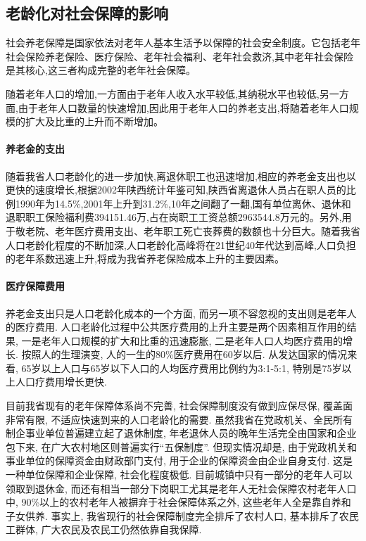 \documentclass[a4paper, 12pt, UTF8]{article}
\begin{document}
\subsection{老龄化对社会保障的影响}
社会养老保障是国家依法对老年人基本生活予以保障的社会安全制度。它包括老年社会保险养老保险、医疗保险、老年社会福利、老年社会救济,其中老年社会保险是其核心,这三者构成完整的老年社会保障。

随着老年人口的增加,一方面由于老年人收入水平较低,其纳税水平也较低,另一方面,由于老年人口数量的快速增加,因此用于老年人口的养老支出,将随着老年人口规模的扩大及比重的上升而不断增加。

\paragraph{养老金的支出} 
随着我省人口老龄化的进一步加快,离退休职工也迅速增加,相应的养老金支出也以更快的速度增长,根据2002年陕西统计年鉴可知,陕西省离退休人员占在职人员的比例1990年为14.5\%,2001年上升到31.2\%,10年之间翻了一翻,国有单位离休、退休和退职职工保险福利费394151.46万,占在岗职工工资总额2963544.8万元的。另外,用于敬老院、老年医疗费用支出、老年职工死亡丧葬费的数额也十分巨大。随着我省人口老龄化程度的不断加深,人口老龄化高峰将在21世纪40年代达到高峰,人口负担的老年系数迅速上升,将成为我省养老保险成本上升的主要因素。

\paragraph{医疗保障费用}
养老金支出只是人口老龄化成本的一个方面, 而另一项不容忽视的支出则是老年人的医疗费用. 人口老龄化过程中公共医疗费用的上升主要是两个因素相互作用的结果, 一是老年人口规模的扩大和比重的迅速膨胀, 二是老年人口人均医疗费用的增长. 按照人的生理演变, 人的一生的80\%医疗费用在60岁以后. 从发达国家的情况来看, 65岁以上人口与65岁以下人口的人均医疗费用比例约为3:1-5:1, 特别是75岁以上人口疗费用增长更快. 

目前我省现有的老年保障体系尚不完善, 社会保障制度没有做到应保尽保, 覆盖面非常有限, 不适应快速到来的人口老龄化的需要. 虽然我省在党政机关、全民所有制企事业单位普遍建立起了退休制度, 年老退休人员的晚年生活完全由国家和企业包下来, 在广大农村地区则普遍实行“五保制度”. 但现实情况却是, 由于党政机关和事业单位的保障资金由财政部门支付, 用于企业的保障资金由企业自身支付. 这是一种单位保障和企业保障, 社会化程度极低. 目前城镇中只有一部分的老年人可以领取到退休金, 而还有相当一部分下岗职工尤其是老年人无社会保障农村老年人口中, 90\%以上的农村老年人被摒弃于社会保障体系之外, 这些老年人全是靠自养和子女供养. 事实上, 我省现行的社会保障制度完全排斥了农村人口, 基本排斥了农民工群体, 广大农民及农民工仍然依靠自我保障. 
\end{document}
